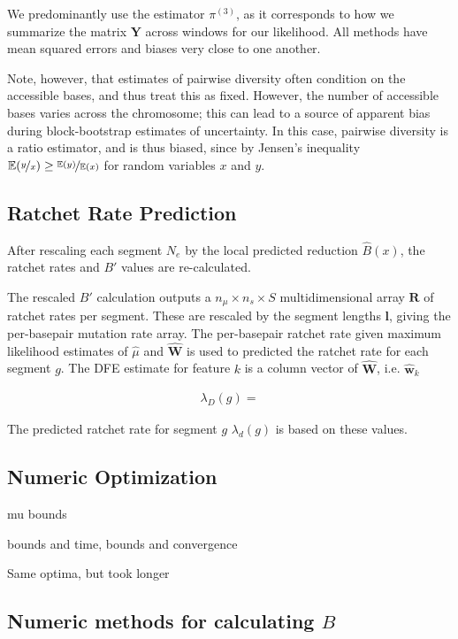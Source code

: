 \documentclass[11pt]{article}
\newcommand{\E}{\mathbb{E}}
\begin{document}
We predominantly use the estimator $\pi^{(3)}$, as it corresponds to how we
summarize the matrix $\mathbf{Y}$ across windows for our likelihood. All
methods have mean squared errors and biases very close to one another.

Note, however, that estimates of pairwise diversity often condition on the
accessible bases, and thus treat this as fixed. However, the number of
accessible bases varies across the chromosome; this can lead to a source of
apparent bias during block-bootstrap estimates of uncertainty.  In this case,
pairwise diversity is a ratio estimator, and is thus biased, since by Jensen's
inequality $\E(\nicefrac{y}{x}) \ge \nicefrac{\E(y)}{\E(x)}$ for random
variables $x$ and $y$. 

\subsection{Ratchet Rate Prediction}

After rescaling each segment $N_e$ by the local predicted reduction
$\hat{B}(x)$, the ratchet rates and $B'$ values are re-calculated. 

The rescaled $B'$ calculation outputs a $n_\mu \times n_s \times S$
multidimensional array $\mathbf{R}$ of ratchet rates per segment. These are
rescaled by the segment lengths $\mathbf{l}$, giving the per-basepair mutation
rate array. The per-basepair ratchet rate given maximum likelihood estimates of
$\hat{\mu}$ and $\widehat{\mathbf{W}}$ is used to predicted the ratchet rate
for each segment $g$. The DFE estimate for feature $k$ is a column vector of
$\widehat{\mathbf{W}}$, i.e. $\widehat{\mathbf{w}}_k$

\begin{align}
  \lambda_D(g) = 
\end{align}

The predicted ratchet rate for segment $g$ $\lambda_d(g)$ is based on these
values.
 
\subsection{Numeric Optimization}
\label{supp:optim}


mu bounds 

bounds and time, bounds and convergence

Same optima, but took longer



\subsection{Numeric methods for calculating $B$}
\end{document}
